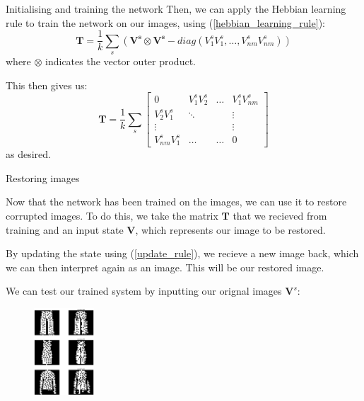 \documentclass[25pt, a0paper, portrait]{beamer}
\newlength{\colwidth}
\begin{document}
\begin{frame}[t]
\begin{columns}[t]
\begin{column}{\colwidth}
\begin{block}{Initialising and training the network}
    Then, we can apply the Hebbian learning rule to train the network on our images, using
    (\ref{hebbian_learning_rule}):
    \begin{equation} \label{hebbian_simple_eq}
      \boldsymbol{T} = \frac{1}{k} \sum_{s}(\boldsymbol{V^s}\otimes\boldsymbol{V^s} - diag({V^s_1}{V^s_1}, \dots, {V^s_{nm}}{V^s_{nm}}))
    \end{equation}
    where $\otimes$ indicates the vector outer product.

    This then gives us:
    \begin{equation*}
      \boldsymbol{T} = \frac{1}{k} \sum_{s} \begin{bmatrix}
        0                 & {V^s_1}{V^s_2}  & \dots   & {V^s_1}{V^s_{nm}}\\
        {V^s_2}{V^s_1}    & \ddots          &         & \vdots \\
        \vdots            &                 &         & \vdots \\
        {V^s_{nm}}{V^s_1} & \dots           & \dots   & 0
      \end{bmatrix}
    \end{equation*}
    as desired.

  \end{block}

  \begin{block}{Restoring images} \small

    Now that the network has been trained on the images, we can use it to restore
    corrupted images. To do this, we take the matrix $\boldsymbol{T}$ that we
    recieved from training and an input state $\boldsymbol{V}$, which represents
    our image to be restored.

    By updating the state using (\ref{update_rule}), we recieve a new image back,
    which we can then interpret again as an image. This will be our restored image.

    We can test our trained system by inputting our orignal images $\boldsymbol{V}^s$:
    
    \begin{figure}
      \centering
      \includegraphics[width=0.2\textwidth]{bwoutput}
    \end{figure}


\end{block}
\end{column}
\end{columns}
\end{frame}
\end{document}
